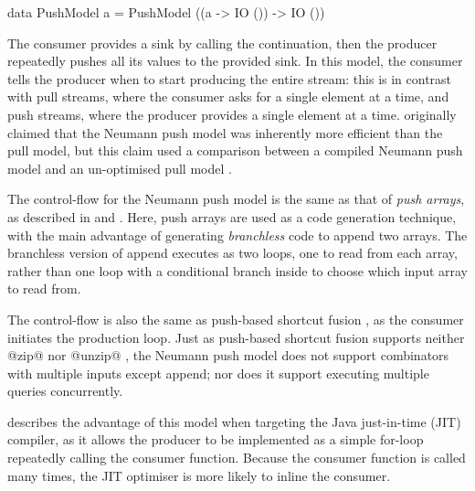 \begin{haskell}
data PushModel a = PushModel ((a -> IO ()) -> IO ())
\end{haskell}

The consumer provides a sink by calling the continuation, then the producer repeatedly pushes all its values to the provided sink.
In this model, the consumer tells the producer when to start producing the entire stream: this is in contrast with pull streams, where the consumer asks for a single element at a time, and push streams, where the producer provides a single element at a time.
\citet{neumann2011efficiently} originally claimed that the Neumann push model was inherently more efficient than the pull model, but this claim used a comparison between a compiled Neumann push model and an un-optimised pull model \cite{shaikhha2018push}.

The control-flow for the Neumann push model is the same as that of \emph{push arrays}, as described in \citet{claessen2012expressive} and \citet{svensson2014defunctionalizing}.
Here, push arrays are used as a code generation technique, with the main advantage of generating \emph{branchless} code to append two arrays.
The branchless version of append executes as two loops, one to read from each array, rather than one loop with a conditional branch inside to choose which input array to read from.

The control-flow is also the same as push-based shortcut fusion \cite{gill1993short}, as the consumer initiates the production loop.
Just as push-based shortcut fusion supports neither @zip@ nor @unzip@ \cite{svenningsson2002shortcut}, the Neumann push model does not support combinators with multiple inputs except append; nor does it support executing multiple queries concurrently.

\citet{biboudis2017expressive} describes the advantage of this model when targeting the Java just-in-time (JIT) compiler, as it allows the producer to be implemented as a simple for-loop repeatedly calling the consumer function.
Because the consumer function is called many times, the JIT optimiser is more likely to inline the consumer.




